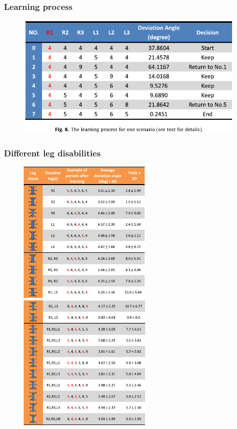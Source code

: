 \documentclass{beamer}
\begin{document}
\begin{frame}
\frametitle{Learning process}
\begin{figure}
\center
\includegraphics[width=1\textwidth]{figs/learning-process.pdf}
\end{figure}
\end{frame}

\begin{frame}
\frametitle{Different leg disabilities}
\vspace*{-0.6cm}
\begin{figure}
\hspace*{-1cm}
\includegraphics[width=0.58\textwidth]{figs/disable-legs-list-1.pdf}
\includegraphics[width=0.58\textwidth]{figs/disable-legs-list-2.pdf}
\end{figure}
\end{frame}
\end{document}
